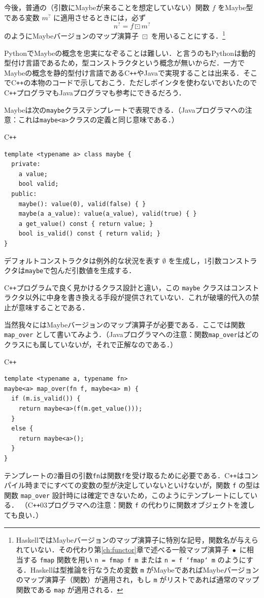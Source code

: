 \documentclass[a4paper]{jsbook}
\newcommand{\programminglanguage}[1]{\textsf{#1}}
\newcommand{\cxx}{\programminglanguage{C}\texttt{++}}
\newcommand{\cxxzerothree}{\cxx\programminglanguage{03}}
\newcommand{\haskell}{\programminglanguage{Haskell}}
\newcommand{\java}{\programminglanguage{Java}}
\newcommand{\python}{\programminglanguage{Python}}
\newcommand{\code}[1]{\texttt{#1}}
\newenvironment{cxxcode}{\begin{itembox}[r]{\cxx}}{\end{itembox}}
\newcommand{\mNothing}{\emptyset}
\newcommand{\mMaybe}[1]{{#1}^\text{?}}
\DeclareMathOperator{\mMap}{\bullet}
\DeclareMathOperator{\mMapMaybe}{\boxdot}
\begin{document}
今後，普通の（引数にMaybeが来ることを想定していない）関数 $f$ をMaybe型である変数 $\mMaybe{m}$ に適用させるときには，必ず
\begin{equation}
\mMaybe{n}=f\mMapMaybe\mMaybe{m}
\end{equation}
のようにMaybeバージョンのマップ演算子 $\mMapMaybe$ を用いることにする．\footnote{\haskell ではMaybeバージョンのマップ演算子に特別な記号，関数名が与えられていない．その代わり第\ref{ch:functor}章で述べる一般マップ演算子 $\mMap$ に相当する \code{fmap} 関数を用い \code{n = fmap f m} または \code{n = f `fmap` m} のようにする．\haskell は型推論を行なうため変数 \code{m} がMaybeであればMaybeバージョンのマップ演算子（関数）が適用され，もし \code{m} がリストであれば通常のマップ関数である \code{map} が適用される．}

\python でMaybeの概念を忠実になぞることは難しい．と言うのも\python は動的型付け言語であるため，型コンストラクタという概念が無いからだ．一方でMaybeの概念を静的型付け言語である\cxx や\java で実現することは出来る．そこで\cxx の本物のコードで示しておこう．ただしポインタを使わないでおいたので\cxx プログラマも\java プログラマも参考にできるだろう．

Maybeは次の\code{maybe}クラステンプレートで表現できる．（\java プログラマへの注意：これは\code{maybe<a>}クラスの定義と同じ意味である．）
\begin{cxxcode}
\begin{verbatim}
template <typename a> class maybe {
  private:
    a value;
    bool valid;
  public:
    maybe(): value(0), valid(false) { }
    maybe(a a_value): value(a_value), valid(true) { }
    a get_value() const { return value; }
    bool is_valid() const { return valid; }
}
\end{verbatim}
\end{cxxcode}
デフォルトコンストラクタは例外的な状況を表す $\mNothing$ を生成し，1引数コンストラクタは\code{maybe}で包んだ引数値を生成する．

\cxx プログラムで良く見かけるクラス設計と違い，この \code{maybe} クラスはコンストラクタ以外に中身を書き換える手段が提供されていない．これが破壊的代入の禁止が意味することである．

当然我々にはMaybeバージョンのマップ演算子が必要である．ここでは関数 \code{map\_over} として書いてみよう．（\java プログラマへの注意：関数\code{map\_over}はどのクラスにも属していないが，それで正解なのである．）
\begin{cxxcode}
\begin{verbatim}
template <typename a, typename fn>
maybe<a> map_over(fn f, maybe<a> m) {
  if (m.is_valid()) {
    return maybe<a>(f(m.get_value()));
  }
  else {
    return maybe<a>();
  }
}
\end{verbatim}
\end{cxxcode}
テンプレートの2番目の引数\code{fn}は関数\code{f}を受け取るために必要である．\cxx はコンパイル時までにすべての変数の型が決定していないといけないが，関数 \code{f} の型は関数 \code{map\_over} 設計時には確定できないため，このようにテンプレートにしている．
（\cxxzerothree プログラマへの注意：関数 \code{f} の代わりに関数オブジェクトを渡しても良い．）
\end{document}
